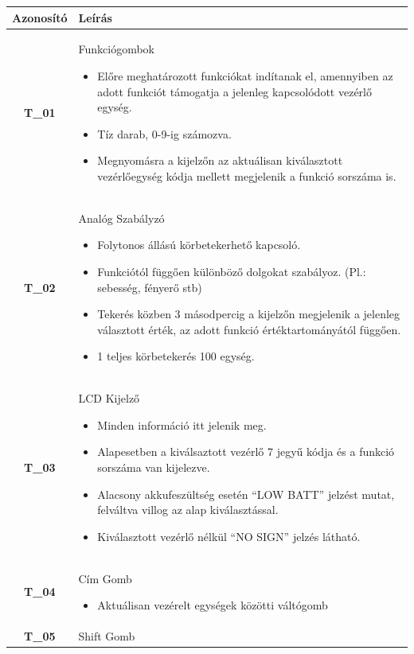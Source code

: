 \documentclass{article}
\begin{document}
\begingroup
\centering
\begin{longtable}{|c|p{14cm}|}
\hline
\textbf{Azonosító} & \textbf{Leírás}        \\ 
\hline
       \textbf{T\_01}  & Funkciógombok
       \begin{itemize}
        \item Előre meghatározott funkciókat indítanak el, amennyiben az adott funkciót támogatja a jelenleg kapcsolódott vezérlő egység.
        \item Tíz darab, 0-9-ig számozva.
        \item Megnyomásra a kijelzőn az aktuálisan kiválasztott vezérlőegység kódja mellett megjelenik a funkció sorszáma is.
        \end{itemize}
       \\\hline
       \textbf{T\_02}  & Analóg Szabályzó 
       \begin{itemize}
        \item Folytonos állású körbetekerhető kapcsoló.
        \item Funkciótól függően különböző dolgokat szabályoz. (Pl.: sebesség, fényerő stb)
        \item Tekerés közben 3 másodpercig a kijelzőn megjelenik a jelenleg választott érték, az adott funkció értéktartományától függően.
        \item 1 teljes körbetekerés 100 egység.
        \end{itemize}
       \\\hline
       \textbf{T\_03}  & LCD Kijelző
       \begin{itemize}
        \item Minden információ itt jelenik meg.
        \item Alapesetben a kiválsaztott vezérlő 7 jegyű kódja és a funkció sorszáma van kijelezve. 
        \item Alacsony akkufeszültség esetén “LOW BATT” jelzést mutat, felváltva villog az alap kiválasztással.
        \item Kiválasztott vezérlő nélkül “NO SIGN” jelzés látható.
        \end{itemize}
       \\\hline
       \textbf{T\_04}  & Cím Gomb 
       \begin{itemize}
        \item Aktuálisan vezérelt egységek közötti váltógomb
        \end{itemize}
       \\\hline
       \textbf{T\_05}  & Shift Gomb 

\end{longtable}
\end{document}
